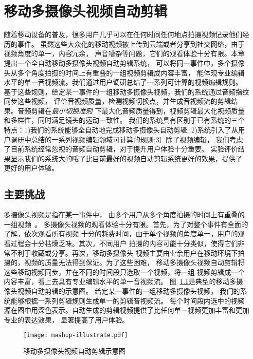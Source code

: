 \chapter{移动多摄像头视频自动剪辑}
随着移动设备的普及，很多用户几乎可以在任何时间任何地点拍摄视频记录他们经历的事件。
虽然这些大众化的移动视频被上传到云端或者分享到社交网络，由于视频角度的单一，内容冗余，
声音嘈杂等问题，它们的观看体验十分有限。本章提出一个全自动移动多摄像头视频自动剪辑系统，
可以将同一事件中，多个摄像头从多个角度拍摄的时间上有重叠的一组视频剪辑成内容丰富，
能体现专业编辑水平的单一音视频流。我们通过用户调研总结了一系列可计算的视频编辑规则。
基于这些规则，给定某一事件的一组移动多摄像头视频，我们的系统通过音频指纹同步这些视频，
评价音视频质量，检测视频切换点，并生成音视频流的剪辑结果。音频剪辑在\emph{最小切换准则}
下最大化音频质量得到，视频剪辑最大化视频质量和多样性，同时满足镜头的运动一致性。
我们的系统具有区别于已有系统的三个特点：1)我们的系统能够全自动地完成移动多摄像头自动剪辑;
2)系统引入了从用户调研中总结的一系列视频编辑领域可计算的规则;3）除了视频编辑，
我们考虑了目前系统经常忽视的音频自动剪辑，对于提升用户体验十分重要。
实验评价结果显示我们的系统大的哦了比目前最好的视频自动剪辑系统更好的效果，提供了
更好的用户体验。

\section{主要挑战}
多摄像头视频是指在某一事件中，
由多个用户从多个角度拍摄的时间上有重叠的一组视频~\cite{DBLP:conf/mm/ShresthaWWBA10}。
多摄像头视频的观看体验十分有限。首先，为了对整个事件有全面的了解，依次观看所有视频
十分的耗费时间，由于单个视频的角度单一，用户的观看过程会十分枯燥乏味。其次，不同用户
拍摄的内容可能十分类似，使得它们非常不利于收藏或分享。再次，移动多摄像头
视频主要由业余用户在移动环境下拍摄的，视频的质量无法得到保证。为了这些困难，
移动多摄像头视频自动剪辑将这些移动视频同步，并在不同的时间段只选取一个视频，将一组
视频剪辑成一个内容丰富，看上去具有专业编辑水平的单一音视频流。
图~\ref{fig:mashup-illustrate}是典型的移动多摄像头视频自动剪辑的示意图。
给定某一事件的一组移动多摄像头视频， 我们的系统能够根据一系列剪辑规则生成单一的剪辑音视频流。
每个时间段内选中的视频源在图中用深色表示。自动生成的剪辑视频提供了比任何单一视频更加丰富和更加专业的表达效果，
显著提高了用户体验。
\begin{figure}[ht]
    \centering
    \texttt{[image: mashup-illustrate.pdf]}
    \caption{移动多摄像头视频自动剪辑示意图}
    \label{fig:mashup-illustrate}
\end{figure}

